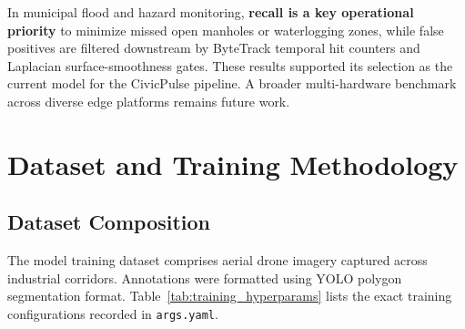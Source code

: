 \documentclass[11pt,a4paper]{article}
\begin{document}
In municipal flood and hazard monitoring, \textbf{recall is a key operational priority} to minimize missed open manholes or waterlogging zones, while false positives are filtered downstream by ByteTrack temporal hit counters and Laplacian surface-smoothness gates. These results supported its selection as the current model for the CivicPulse pipeline. A broader multi-hardware benchmark across diverse edge platforms remains future work.

\section{Dataset and Training Methodology}

\subsection{Dataset Composition}
The model training dataset comprises aerial drone imagery captured across industrial corridors. Annotations were formatted using YOLO polygon segmentation format. Table~\ref{tab:training_hyperparams} lists the exact training configurations recorded in \texttt{args.yaml}.
\end{document}
